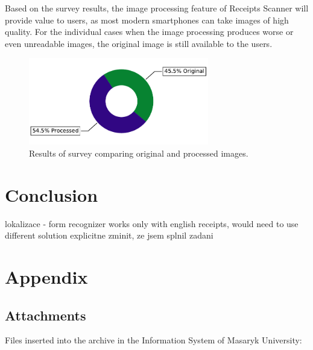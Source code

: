 \documentclass[
  digital, %
  table,   %
  oneside, %
  lof,     %
  lot,     %
]{fithesis3}
\DeclareRobustCommand{\thinskip}{\hskip 0.16667em\relax}
\def\emdash{---}
\def\dosh#1#2{\unskip#1\thinskip#2\thinskip\ignorespaces}
\def\Dash{\dosh\nobreak\emdash}
\begin{document}
Based on the survey results, the image processing feature of Receipts Scanner will provide value to users, as most modern smartphones can take images of high quality. For the individual cases when the image processing produces worse or even unreadable images, the original image is still available to the users.

\begin{figure}
    \begin{center}
        \includegraphics[width=0.7\textwidth]{figures/graphs/which_image_is_more_readable}
    \end{center}
    \caption{Results of survey comparing original and processed images.}
    \label{fig:which_image_is_more_readable}
\end{figure}

\chapter{Conclusion}
lokalizace - form recognizer works only with english receipts, would need to use different solution
explicitne zminit, ze jsem splnil zadani 



\appendix %

\chapter{Appendix}
\section{Attachments}
Files inserted into the archive in the Information System of Masaryk
University:
\end{document}
